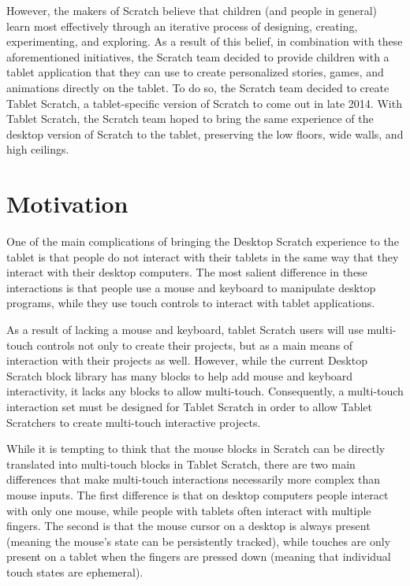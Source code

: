 However, the makers of Scratch believe that children (and people in general) learn most effectively through an iterative process of designing, creating, experimenting, and exploring. As a result of this belief, in combination with these aforementioned initiatives, the Scratch team decided to provide children with a tablet application that they can use to create personalized stories, games, and animations directly on the tablet. To do so, the Scratch team decided to create Tablet Scratch, a tablet-specific version of Scratch to come out in late 2014. With Tablet Scratch, the Scratch team hoped to bring the same experience of the desktop version of Scratch to the tablet, preserving the low floors, wide walls, and high ceilings.

\section{Motivation}
One of the main complications of bringing the Desktop Scratch experience to the tablet is that people do not interact with their tablets in the same way that they interact with their desktop computers. The most salient difference in these interactions is that people use a mouse and keyboard to manipulate desktop programs, while they use touch controls to interact with tablet applications.

As a result of lacking a mouse and keyboard, tablet Scratch users will use multi-touch controls not only to create their projects, but as a main means of interaction with their projects as well. However, while the current Desktop Scratch block library has many blocks to help add mouse and keyboard interactivity, it lacks any blocks to allow multi-touch. Consequently, a multi-touch interaction set must be designed for Tablet Scratch in order to allow Tablet Scratchers to create multi-touch interactive projects.

While it is tempting to think that the mouse blocks in Scratch can be directly translated into multi-touch blocks in Tablet Scratch, there are two main differences that make multi-touch interactions necessarily more complex than mouse inputs. The first difference is that on desktop computers people interact with only one mouse, while people with tablets often interact with multiple fingers. The second is that the mouse cursor on a desktop is always present (meaning the mouse's state can be persistently tracked), while touches are only present on a tablet when the fingers are pressed down (meaning that individual touch states are ephemeral).

